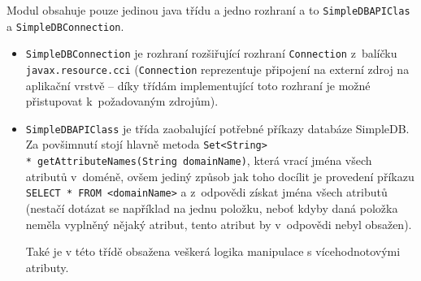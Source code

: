 \documentclass[oneside,12pt,final]{fithesis2}
\begin{document}
Modul obsahuje pouze jedinou java třídu a jedno rozhraní a to \texttt{SimpleDB\allowbreak APIClas} a \verb<SimpleDBConnection<.
\begin{itemize}
 \item \verb<SimpleDBConnection< je rozhraní rozšiřující rozhraní \verb<Connection< z~balíčku \verb<javax.resource.cci< (\verb<Connection< reprezentuje připojení na externí zdroj na aplikační vrstvě -- díky třídám implementující toto rozhraní je možné přistupovat k~požadovaným zdrojům).
 \item \verb<SimpleDBAPIClass< je třída zaobalující potřebné příkazy databáze SimpleDB. Za povšimnutí stojí hlavně metoda \texttt{Set<String> \\* getAttributeNames(String domainName)}, která vrací jména všech atributů v~doméně, ovšem jediný způsob jak toho docílit je provedení příkazu \texttt{SELECT * FROM <domainName>} a z~odpovědi získat jména všech atributů (nestačí dotázat se například na jednu položku, neboť kdyby daná položka neměla vyplněný nějaký atribut, tento atribut by v~odpovědi nebyl obsažen).
 
 Také je v této třídě obsažena veškerá logika manipulace s vícehodnotovými atributy.
\end{itemize}
\end{document}

